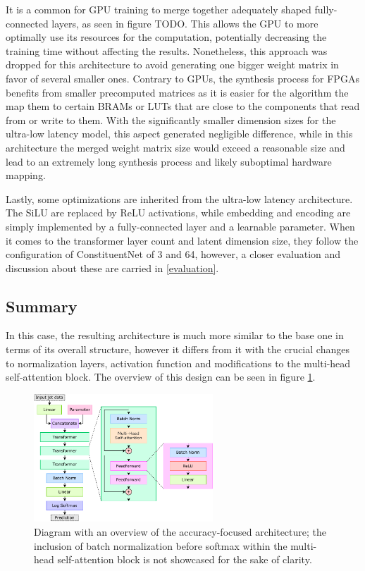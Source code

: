 It is a common for GPU training to merge together adequately shaped fully-connected layers, as seen in figure TODO. This allows the GPU to more optimally use its resources for the computation, potentially decreasing the training time without affecting the results. Nonetheless, this approach was dropped for this architecture to avoid generating one bigger weight matrix in favor of several smaller ones. Contrary to GPUs, the synthesis process for FPGAs benefits from smaller precomputed matrices as it is easier for the algorithm the map them to certain BRAMs or LUTs that are close to the components that read from or write to them. With the significantly smaller dimension sizes for the ultra-low latency model, this aspect generated negligible difference, while in this architecture the merged weight matrix size would exceed a reasonable size and lead to an extremely long synthesis process and likely suboptimal hardware mapping.

Lastly, some optimizations are inherited from the ultra-low latency architecture. The SiLU are replaced by ReLU activations, while embedding and encoding are simply implemented by a fully-connected layer and a learnable parameter. When it comes to the transformer layer count and latent dimension size, they follow the configuration of ConstituentNet of 3 and 64, however, a closer evaluation and discussion about these are carried in \cref{evaluation}.

\subsection{Summary}
In this case, the resulting architecture is much more similar to the base one in terms of its overall structure, however it differs from it with the crucial changes to normalization layers, activation function and modifications to the multi-head self-attention block. The overview of this design can be seen in figure \ref{fig:constituent-net-accuracy}.

\begin{figure}[hpt!]
  \centering
  \includegraphics[trim={0cm 0cm 0cm 0cm}, width=0.6\textwidth, center]{models/constituent_net_accuracy.pdf}
  \caption{Diagram with an overview of the accuracy-focused architecture; the inclusion of batch normalization before softmax within the multi-head self-attention block is not showcased for the sake of clarity.}
  \label{fig:constituent-net-accuracy}
\end{figure}


